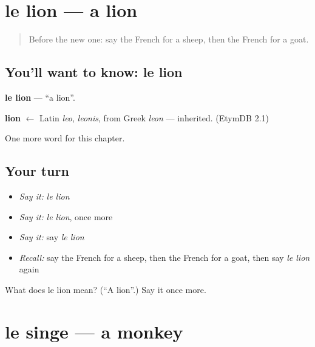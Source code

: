 \section[le lion]{le lion — a lion}

\label{lesson:FR-C87-lion}



\begin{quote}
Before the new one: say the French for a sheep, then the French for a goat.
\end{quote}

\subsection*{You'll want to know: le lion}
\textbf{le lion} — \textquotedblleft{}a lion\textquotedblright{}.

\begin{cousinweb}
\textbf{lion} $\leftarrow$ Latin \emph{leo}, \emph{leonis}, from Greek \emph{leon} — inherited. (EtymDB 2.1)
\end{cousinweb}

\begin{grammarlens}[title={What you've built}]
One more word for this chapter.
\end{grammarlens}

\subsection*{Your turn}
\begin{itemize}
\raggedright
  \item \emph{Say it:} \emph{le lion}
  \item \emph{Say it:} \emph{le lion}, once more
  \item \emph{Say it:} say \emph{le lion}
  \item \emph{Recall:} say the French for a sheep, then the French for a goat, then say \emph{le lion} again
\end{itemize}

\begin{tcolorbox}[breakable,colback=teal!4,colframe=teal!35!black,title={Before you move on}]
What does le lion mean? (\textquotedblleft{}A lion\textquotedblright{}.) Say it once more.
\end{tcolorbox}
\section[le singe]{le singe — a monkey}


